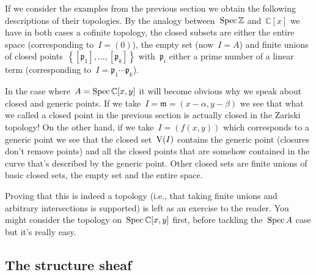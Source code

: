 If we consider the examples from the previous section we obtain the following descriptions of their topologies. By the analogy between~$\operatorname{Spec}\mathbb{Z}$ and~$\mathbb{C}[x]$ we have in both cases a cofinite topology, the closed subsets are either the entire space (corresponding to~$I=(0)$), the empty set (now~$I=A$) and finite unions of closed points~$\left\{ [\mathfrak{p}_1],\ldots,[\mathfrak{p}_k] \right\}$ with~$\mathfrak{p}_i$ either a prime number of a linear term (corresponding to~$I=\mathfrak{p}_1\cdots\mathfrak{p}_k$).

In the case where~$A=\operatorname{Spec}\mathbb{C}[x,y]$ it will become obvious why we speak about closed and generic points. If we take~$I=\mathfrak{m}=(x-\alpha,y-\beta)$ we see that what we called a closed point in the previous section is actually closed in the Zariski topology! On the other hand, if we take~$I=(f(x,y))$ which corresponds to a generic point we see that the closed set~$\operatorname{V}(I)$ contains the generic point (closures don't remove points) and all the closed points that are somehow contained in the curve that's described by the generic point. Other closed sets are finite unions of basic closed sets, the empty set and the entire space.

Proving that this is indeed a topology (i.e., that taking finite unions and arbitrary intersections is supported) is left as an exercise to the reader. You might consider the topology on~$\operatorname{Spec}\mathbb{C}[x,y]$ first, before tackling the~$\operatorname{Spec} A$ case but it's really easy.

\subsection{The structure sheaf}

